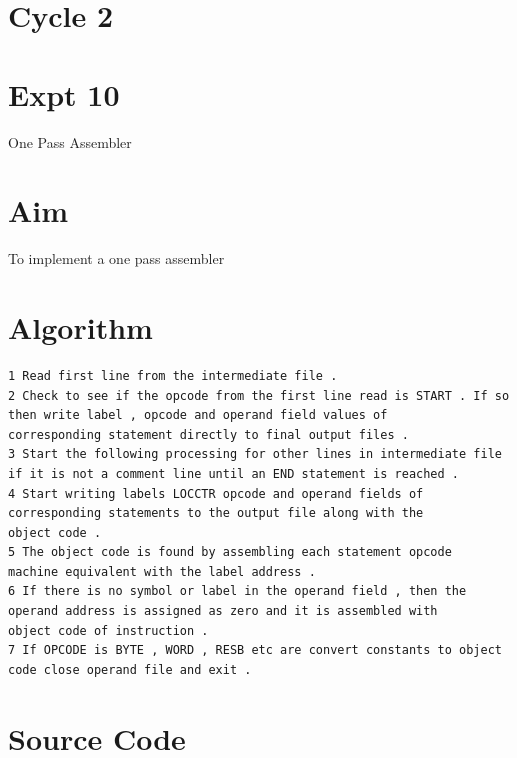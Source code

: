 \documentclass[13pt,oneside]{book}
\begin{document}
\section*{Cycle 2}
\section*{Expt 10}
\begin{center}
    \Large{One Pass Assembler}
\end{center}
\section*{Aim}
\large
To implement a one pass assembler

\section*{Algorithm} 
    \begin{verbatim}
1 Read first line from the intermediate file .
2 Check to see if the opcode from the first line read is START . If so
then write label , opcode and operand field values of
corresponding statement directly to final output files .
3 Start the following processing for other lines in intermediate file
if it is not a comment line until an END statement is reached .
4 Start writing labels LOCCTR opcode and operand fields of
corresponding statements to the output file along with the
object code .
5 The object code is found by assembling each statement opcode
machine equivalent with the label address .
6 If there is no symbol or label in the operand field , then the
operand address is assigned as zero and it is assembled with
object code of instruction .
7 If OPCODE is BYTE , WORD , RESB etc are convert constants to object
code close operand file and exit .
	\end{verbatim}

\section*{Source Code}
\small
\end{document}
